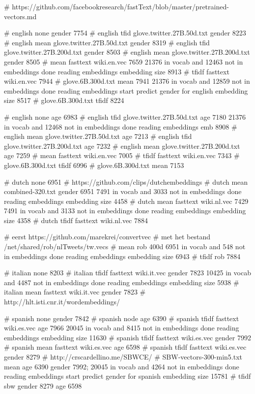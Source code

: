 \documentclass[11pt]{article}
\begin{document}
# https://github.com/facebookresearch/fastText/blob/master/pretrained-vectors.md

# english none                              gender  7754
# english tfid glove.twitter.27B.50d.txt    gender 8223
# english mean glove.twitter.27B.50d.txt    gender 8319
# english tfid glove.twitter.27B.200d.txt   gender 8503
# english mean glove.twitter.27B.200d.txt   gender 8505
# mean fasttext wiki.en.vec 7659 21376 in vocab and 12463 not in embeddings done reading embeddings embedding size 8913
# tfidf fasttext wiki.en.vec 7944
# glove.6B.300d.txt mean 7941 21376 in vocab and 12859 not in embeddings done reading embeddings start predict gender for english embedding size 8517
# glove.6B.300d.txt tfidf 8224

# english none                            age  6983
# english tfid glove.twitter.27B.50d.txt  age  7180 21376 in vocab and 12468 not in embeddings done reading embeddings emb 8908
# english mean glove.twitter.27B.50d.txt  age  7213
# english tfid glove.twitter.27B.200d.txt age  7232
# english mean glove.twitter.27B.200d.txt age  7259
# mean fasttext wiki.en.vec 7005
# tfidf fasttext wiki.en.vec 7343
# glove.6B.300d.txt tfidf 6996
# glove.6B.300d.txt mean 7153

# dutch none                          6951
# https://github.com/clips/dutchembeddings
# dutch mean combined-320.txt gender 6951 7491 in vocab and 3033 not in embeddings done reading embeddings embedding size 4458
# dutch mean fasttext wiki.nl.vec     7429 7491 in vocab and 3133 not in embeddings done reading embeddings embedding size 4358
# dutch tfidf fasttext wiki.nl.vec 7884

# eerst https://github.com/marekrei/convertvec
# met het bestand /net/shared/rob/nlTweets/tw.vecs
# mean rob 400d  6951 in vocab and 548 not in embeddings done reading embeddings embedding size 6943
# tfidf rob 7884

# italian none 8203
# italian tfidf fasttext wiki.it.vec gender 7823 10425 in vocab and 4487 not in embeddings done reading embeddings embedding size 5938
# italian mean fasttext wiki.it.vec gender 7823
# http://hlt.isti.cnr.it/wordembeddings/

# spanish none gender 7842
# spanish node age 6390
# spanish tfidf fasttext wiki.es.vec age 7966 20045 in vocab and 8415 not in embeddings done reading embeddings embedding size 11630
# spanish tfidf fasttext wiki.es.vec gender 7992
# spanish mean fasttext wiki.es.vec age 6598
# spanish tfidf fasttext wiki.es.vec gender 8279
# http://crscardellino.me/SBWCE/
# SBW-vectors-300-min5.txt mean age 6390 gender 7992;  20045 in vocab and 4264 not in embeddings done reading embeddings start predict gender for spanish embedding size 15781
# tfidf sbw gender 8279 age 6598



\end{document}
